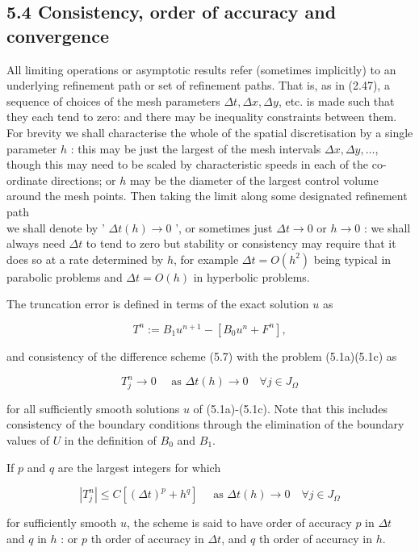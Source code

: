 \documentclass[10pt]{article}
\begin{document}
\subsection*{5.4 Consistency, order of accuracy and convergence}
All limiting operations or asymptotic results refer (sometimes implicitly) to an underlying refinement path or set of refinement paths. That is, as in (2.47), a sequence of choices of the mesh parameters \(\Delta t, \Delta x, \Delta y\), etc. is made such that they each tend to zero: and there may be inequality constraints between them. For brevity we shall characterise the whole of the spatial discretisation by a single parameter \(h\) : this may be just the largest of the mesh intervals \(\Delta x, \Delta y, \ldots\), though this may need to be scaled by characteristic speeds in each of the co-ordinate directions; or \(h\) may be the diameter of the largest control volume around the mesh points. Then taking the limit along some designated refinement path\\
we shall denote by ' \(\Delta t(h) \rightarrow 0\) ', or sometimes just \(\Delta t \rightarrow 0\) or \(h \rightarrow 0\) : we shall always need \(\Delta t\) to tend to zero but stability or consistency may require that it does so at a rate determined by \(h\), for example \(\Delta t=O\left(h^{2}\right)\) being typical in parabolic problems and \(\Delta t=O(h)\) in hyperbolic problems.

The truncation error is defined in terms of the exact solution \(u\) as

\[
T^{n}:=B_{1} u^{n+1}-\left[B_{0} u^{n}+F^{n}\right],
\]

and consistency of the difference scheme (5.7) with the problem (5.1a)(5.1c) as

\[
T_{j}^{n} \rightarrow 0 \quad \text { as } \Delta t(h) \rightarrow 0 \quad \forall j \in J_{\Omega}
\]

for all sufficiently smooth solutions \(u\) of (5.1a)-(5.1c). Note that this includes consistency of the boundary conditions through the elimination of the boundary values of \(U\) in the definition of \(B_{0}\) and \(B_{1}\).

If \(p\) and \(q\) are the largest integers for which

\[
\left|T_{j}^{n}\right| \leq C\left[(\Delta t)^{p}+h^{q}\right] \quad \text { as } \Delta t(h) \rightarrow 0 \quad \forall j \in J_{\Omega}
\]

for sufficiently smooth \(u\), the scheme is said to have order of accuracy \(p\) in \(\Delta t\) and \(q\) in \(h\) : or \(p\) th order of accuracy in \(\Delta t\), and \(q\) th order of accuracy in \(h\).
\end{document}
